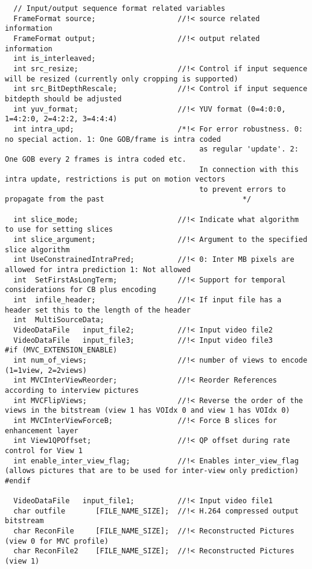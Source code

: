 \begin{lstlisting}
  // Input/output sequence format related variables
  FrameFormat source;                   //!< source related information
  FrameFormat output;                   //!< output related information
  int is_interleaved;
  int src_resize;                       //!< Control if input sequence will be resized (currently only cropping is supported)
  int src_BitDepthRescale;              //!< Control if input sequence bitdepth should be adjusted
  int yuv_format;                       //!< YUV format (0=4:0:0, 1=4:2:0, 2=4:2:2, 3=4:4:4)
  int intra_upd;                        /*!< For error robustness. 0: no special action. 1: One GOB/frame is intra coded
                                             as regular 'update'. 2: One GOB every 2 frames is intra coded etc.
                                             In connection with this intra update, restrictions is put on motion vectors
                                             to prevent errors to propagate from the past                                */

  int slice_mode;                       //!< Indicate what algorithm to use for setting slices
  int slice_argument;                   //!< Argument to the specified slice algorithm
  int UseConstrainedIntraPred;          //!< 0: Inter MB pixels are allowed for intra prediction 1: Not allowed
  int  SetFirstAsLongTerm;              //!< Support for temporal considerations for CB plus encoding
  int  infile_header;                   //!< If input file has a header set this to the length of the header
  int  MultiSourceData;
  VideoDataFile   input_file2;          //!< Input video file2
  VideoDataFile   input_file3;          //!< Input video file3
#if (MVC_EXTENSION_ENABLE)
  int num_of_views;                     //!< number of views to encode (1=1view, 2=2views)
  int MVCInterViewReorder;              //!< Reorder References according to interview pictures
  int MVCFlipViews;                     //!< Reverse the order of the views in the bitstream (view 1 has VOIdx 0 and view 1 has VOIdx 0)
  int MVCInterViewForceB;               //!< Force B slices for enhancement layer
  int View1QPOffset;                    //!< QP offset during rate control for View 1
  int enable_inter_view_flag;           //!< Enables inter_view_flag (allows pictures that are to be used for inter-view only prediction)
#endif

  VideoDataFile   input_file1;          //!< Input video file1
  char outfile       [FILE_NAME_SIZE];  //!< H.264 compressed output bitstream
  char ReconFile     [FILE_NAME_SIZE];  //!< Reconstructed Pictures (view 0 for MVC profile)
  char ReconFile2    [FILE_NAME_SIZE];  //!< Reconstructed Pictures (view 1)


\end{lstlisting}

